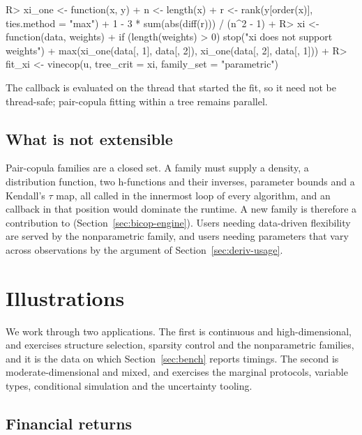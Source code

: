 \documentclass[article]{jss}
\begin{document}
\begin{CodeChunk}
\begin{CodeInput}
R> xi_one <- function(x, y) {
+    n <- length(x)
+    r <- rank(y[order(x)], ties.method = "max")
+    1 - 3 * sum(abs(diff(r))) / (n^2 - 1)
+  }
R> xi <- function(data, weights) {
+    if (length(weights) > 0) stop("xi does not support weights")
+    max(xi_one(data[, 1], data[, 2]), xi_one(data[, 2], data[, 1]))
+  }
R> fit_xi <- vinecop(u, tree_crit = xi, family_set = "parametric")
\end{CodeInput}
\end{CodeChunk}

The callback is evaluated on the thread that started the fit, so it need not be
thread-safe; pair-copula fitting within a tree remains parallel.

\subsection{What is not extensible}\label{sec:not-extensible}

Pair-copula families are a closed set.  A family must supply a density, a
distribution function, two h-functions and their inverses, parameter bounds
and a Kendall's $\tau$ map, all called in the innermost loop of every
algorithm, and an  callback in that position would dominate the
runtime.  A new family is therefore a contribution to 
(Section~\ref{sec:bicop-engine}).  Users needing data-driven flexibility are
served by the nonparametric family, and users needing parameters that vary
across observations by the  argument of
Section~\ref{sec:deriv-usage}.

\section{Illustrations}\label{sec:illustrations}

We work through two applications.  The first is continuous and
high-dimensional, and exercises structure selection, sparsity control and the
nonparametric families, and it is the data on which Section~\ref{sec:bench}
reports timings.  The second is moderate-dimensional and mixed, and
exercises the marginal protocols, variable types, conditional simulation and
the uncertainty tooling.

\subsection{Financial returns}\label{sec:app-returns}
\end{document}
